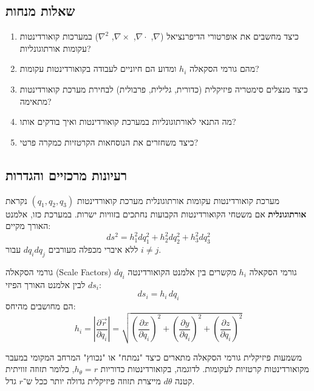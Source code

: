 \documentclass{article}
\begin{document}
\subsection*{שאלות מנחות}

\begin{enumerate}[label=\textbf{\arabic*.}, rightmargin=2em, leftmargin=1em]
\item כיצד מחשבים את אופרטורי הדיפרנציאל ($\nabla$, $\nabla\cdot$, $\nabla\times$, $\nabla^2$) במערכות קואורדינטות עקומות אורתוגונליות?
\item מהם גורמי הסקאלה $h_i$ ומדוע הם חיוניים לעבודה בקואורדינטות עקומות?
\item כיצד מנצלים סימטריה פיזיקלית (כדורית, גלילית, פרבולית) לבחירת מערכת קואורדינטות מתאימה?
\item מה התנאי לאורתוגונליות במערכת קואורדינטות ואיך בודקים אותו?
\item כיצד משחזרים את הנוסחאות הקרטזיות כמקרה פרטי?
\end{enumerate}

\subsection*{רעיונות מרכזיים והגדרות}

\begin{definitionbox}{מערכת קואורדינטות עקומות אורתוגונלית}
מערכת קואורדינטות $(q_1, q_2, q_3)$ נקראת \textbf{אורתוגונלית} אם משטחי הקואורדינטות הקבועות נחתכים בזוויות ישרות. במערכת כזו, אלמנט האורך מקיים:
\[
ds^2 = h_1^2 dq_1^2 + h_2^2 dq_2^2 + h_3^2 dq_3^2
\]
ללא איברי מכפלה מעורבים $dq_i dq_j$ עבור $i \neq j$.
\end{definitionbox}

\begin{definitionbox}{גורמי הסקאלה (Scale Factors)}
גורמי הסקאלה $h_i$ מקשרים בין אלמנט הקואורדינטה $dq_i$ לבין אלמנט האורך הפיזי $ds_i$:
\[
ds_i = h_i \, dq_i
\]
הם מחושבים מהיחס:
\[
h_i = \left| \frac{\partial \vec{r}}{\partial q_i} \right| = \sqrt{\left(\frac{\partial x}{\partial q_i}\right)^2 + \left(\frac{\partial y}{\partial q_i}\right)^2 + \left(\frac{\partial z}{\partial q_i}\right)^2}
\]
\end{definitionbox}

\begin{notebox}{משמעות פיזיקלית}
גורמי הסקאלה מתארים כיצד "נמתח" או "נכווץ" המרחב המקומי במעבר מקואורדינטות קרטזיות לעקומות. לדוגמה, בקואורדינטות כדוריות $h_\theta = r$, כלומר תזוזה זוויתית קטנה $d\theta$ מייצרת תזוזה פיזיקלית גדולה יותר ככל ש־$r$ גדל.
\end{notebox}
\end{document}
